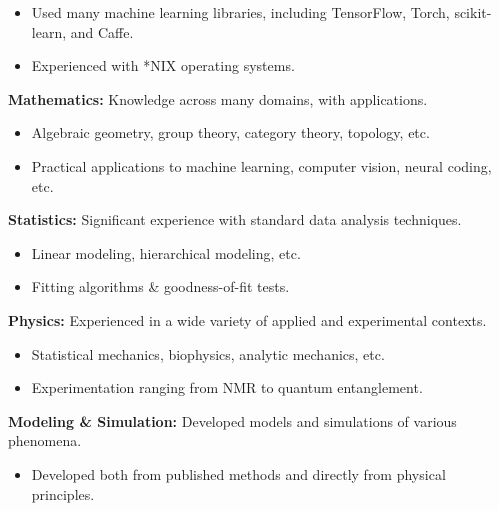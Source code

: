 \documentclass[margin]{res}
\begin{document}
\begin{resume}
\begin{itemize}
  \item Used many machine learning libraries, including TensorFlow, Torch, scikit-learn, and Caffe.
  \item Experienced with *NIX operating systems.
\end{itemize}\vspace{-8pt}
{\bf Mathematics:} Knowledge across many domains, with applications.
\begin{itemize} \itemsep -2pt
\item Algebraic geometry, group theory, category theory, topology, etc. \item Practical applications to machine learning, computer vision, neural coding, etc. \end{itemize}\vspace{-8pt}
{\bf Statistics:} Significant experience with standard data analysis techniques.
\begin{itemize} \itemsep -2pt
  \item Linear modeling, hierarchical modeling, etc.
  \item Fitting algorithms \& goodness-of-fit tests. \end{itemize} \vspace{-8pt}
{\bf Physics:} Experienced in a wide variety of applied and experimental contexts.\begin{itemize} \itemsep -2pt
\item Statistical mechanics, biophysics, analytic mechanics, etc. \item Experimentation ranging from NMR to quantum entanglement. \end{itemize}\vspace{-8pt}
{\bf Modeling \& Simulation:} Developed models and simulations of various phenomena. 
\begin{itemize} \itemsep -2pt
  \item Developed both from published methods and directly from physical principles. \end{itemize}

\end{resume}
\end{document}
